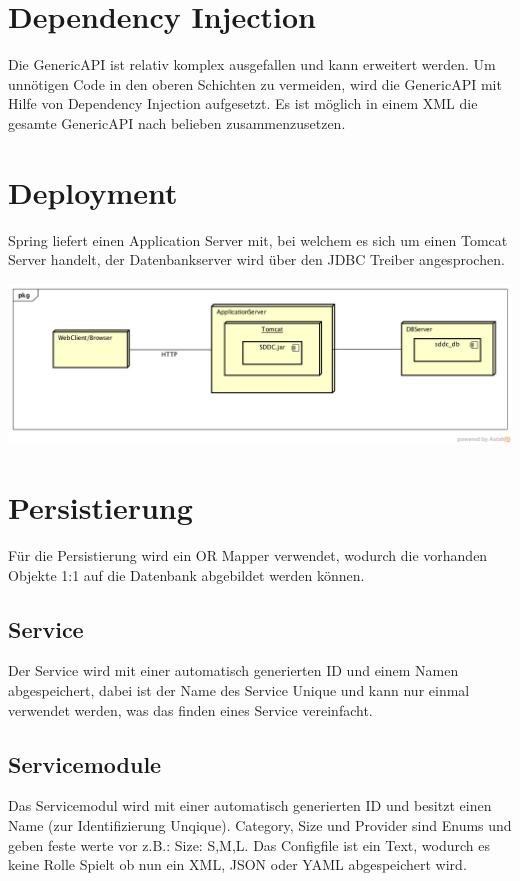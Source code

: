 \section{Dependency Injection}

Die GenericAPI ist relativ komplex ausgefallen und kann erweitert werden. Um unnötigen 
Code in den oberen Schichten zu vermeiden, wird die GenericAPI mit Hilfe von Dependency
 Injection aufgesetzt. Es ist möglich in einem XML die gesamte GenericAPI nach belieben zusammenzusetzen.

\section{Deployment}

Spring liefert einen Application Server mit, bei welchem es sich um einen Tomcat 
Server handelt, der Datenbankserver wird über den JDBC Treiber angesprochen.

\includegraphics[width=\textwidth]{./05_Design/04_Architektur/deployment}

\section{Persistierung}
Für die Persistierung wird ein OR Mapper verwendet, wodurch die vorhanden 
Objekte 1:1 auf die Datenbank abgebildet werden können.

\subsection{Service}
Der Service wird mit einer automatisch generierten ID und einem Namen 
abgespeichert, dabei ist der Name des Service Unique und kann nur einmal 
verwendet werden, was das finden eines Service vereinfacht.

\subsection{Servicemodule}
Das Servicemodul wird mit einer automatisch generierten ID und besitzt einen 
Name (zur Identifizierung Unqique).
Category, Size und Provider sind Enums und geben feste werte vor z.B.: Size: 
S,M,L.
Das Configfile ist ein Text, wodurch es keine Rolle Spielt ob nun ein \ac{XML}, \ac{JSON} 
oder \ac{YAML} abgespeichert wird.

